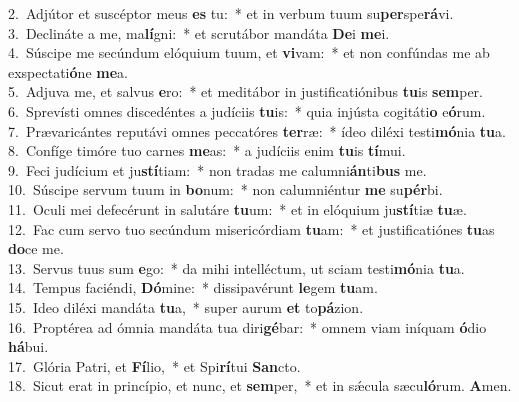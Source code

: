 {2.~}Adjútor et suscéptor meus \textbf{es} tu:~* et in verbum tuum su\textbf{per}spe\textbf{rá}vi.\\
{3.~}Declináte a me, ma\textbf{lí}gni:~* et scrutábor mandáta \textbf{De}i \textbf{me}i.\\
{4.~}Súscipe me secúndum elóquium tuum, et \textbf{vi}vam:~* et non confúndas me ab exspectati\textbf{ó}ne \textbf{me}a.\\
{5.~}Adjuva me, et salvus \textbf{e}ro:~* et meditábor in justificatiónibus \textbf{tu}is \textbf{sem}per.\\
{6.~}Sprevísti omnes discedéntes a judíciis \textbf{tu}is:~* quia injústa cogitáti\textbf{o} e\textbf{ó}rum.\\
{7.~}Prævaricántes reputávi omnes peccatóres \textbf{ter}ræ:~* ídeo diléxi testi\textbf{mó}nia \textbf{tu}a.\\
{8.~}Confíge timóre tuo carnes \textbf{me}as:~* a judíciis enim \textbf{tu}is \textbf{tí}mui.\\
{9.~}Feci judícium et ju\textbf{stí}tiam:~* non tradas me calumni\textbf{án}ti\textbf{bus} me.\\
{10.~}Súscipe servum tuum in \textbf{bo}num:~* non calumniéntur \textbf{me} su\textbf{pér}bi.\\
{11.~}Oculi mei defecérunt in salutáre \textbf{tu}um:~* et in elóquium ju\textbf{stí}tiæ \textbf{tu}æ.\\
{12.~}Fac cum servo tuo secúndum misericórdiam \textbf{tu}am:~* et justificatiónes \textbf{tu}as \textbf{do}ce me.\\
{13.~}Servus tuus sum \textbf{e}go:~* da mihi intelléctum, ut sciam testi\textbf{mó}nia \textbf{tu}a.\\
{14.~}Tempus faciéndi, \textbf{Dó}mine:~* dissipavérunt \textbf{le}gem \textbf{tu}am.\\
{15.~}Ideo diléxi mandáta \textbf{tu}a,~* super aurum \textbf{et} to\textbf{pá}zion.\\
{16.~}Proptérea ad ómnia mandáta tua diri\textbf{gé}bar:~* omnem viam iníquam \textbf{ó}dio \textbf{há}bui.\\
{17.~}Glória Patri, et \textbf{Fí}lio,~* et Spi\textbf{rí}tui \textbf{San}cto.\\
{18.~}Sicut erat in princípio, et nunc, et \textbf{sem}per,~* et in sǽcula sæcu\textbf{ló}rum. \textbf{A}men.\\

